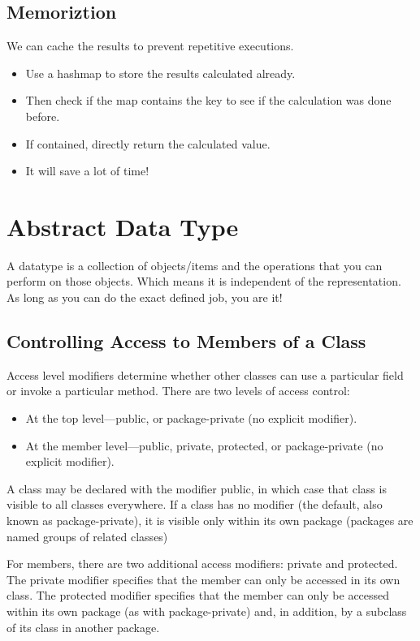 \documentclass[letterpaper,12pt]{article}
\begin{document}
\subsection{Memoriztion}

We can cache the results to prevent repetitive executions.

\begin{itemize}
      \item Use a hashmap to store the results calculated already.
      \item Then check if the map contains the key to see if the calculation was done
            before.
      \item If contained, directly return the calculated value.
      \item It will save a lot of time!
\end{itemize}

\section{Abstract Data Type}

A datatype is a collection of objects/items and the operations that you can
perform on those objects. Which means it is independent of the representation.
As long as you can do the exact defined job, you are it!

\subsection{Controlling Access to Members of a Class}

Access level modifiers determine whether other classes can use a particular
field or invoke a particular method. There are two levels of access control:

\begin{itemize}
      \item At the top level—public, or package-private (no explicit modifier).
      \item At the member level—public, private, protected, or package-private (no explicit
            modifier).
\end{itemize}

A class may be declared with the modifier public, in which case that class is
visible to all classes everywhere. If a class has no modifier (the default,
also known as package-private), it is visible only within its own package
(packages are named groups of related classes)

For members, there are two additional access modifiers: private and protected.
The private modifier specifies that the member can only be accessed in its own
class. The protected modifier specifies that the member can only be accessed
within its own package (as with package-private) and, in addition, by a
subclass of its class in another package.
\end{document}
